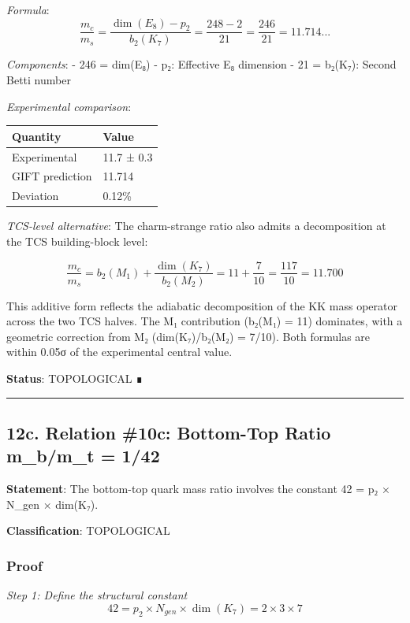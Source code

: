 \documentclass[11pt,a4paper]{article}
\begin{document}
\emph{Formula}:
\[\frac{m_c}{m_s} = \frac{\dim(E_8) - p_2}{b_2(K_7)} = \frac{248 - 2}{21} = \frac{246}{21} = 11.714...\]

\emph{Components}:
- 246 = dim(E₈) - p₂: Effective E₈ dimension
- 21 = b₂(K₇): Second Betti number

\emph{Experimental comparison}:

{\def\LTcaptype{none} %
\begin{longtable}[]{@{}ll@{}}
\toprule\noalign{}
Quantity & Value \\
\midrule\noalign{}
\endhead
\bottomrule\noalign{}
\endlastfoot
Experimental & 11.7 ± 0.3 \\
GIFT prediction & 11.714 \\
Deviation & 0.12\% \\
\end{longtable}
}

\emph{TCS-level alternative}: The charm-strange ratio also admits a decomposition at the TCS building-block level:

\[\frac{m_c}{m_s} = b_2(M_1) + \frac{\dim(K_7)}{b_2(M_2)} = 11 + \frac{7}{10} = \frac{117}{10} = 11.700\]

This additive form reflects the adiabatic decomposition of the KK mass operator across the two TCS halves. The M₁ contribution (b₂(M₁) = 11) dominates, with a geometric correction from M₂ (dim(K₇)/b₂(M₂) = 7/10). Both formulas are within 0.05σ of the experimental central value.

\textbf{Status}: TOPOLOGICAL ∎

\begin{center}\rule{0.5\linewidth}{0.5pt}\end{center}

\subsection{12c. Relation \#10c: Bottom-Top Ratio m\_b/m\_t = 1/42}\label{c.-relation-10c-bottom-top-ratio-m_bm_t-142}

\textbf{Statement}: The bottom-top quark mass ratio involves the constant 42 = p₂ × N\_gen × dim(K₇).

\textbf{Classification}: TOPOLOGICAL

\subsubsection{Proof}\label{proof-10}

\emph{Step 1: Define the structural constant}
\[42 = p_2 \times N_{gen} \times \dim(K_7) = 2 \times 3 \times 7\]
\end{document}
